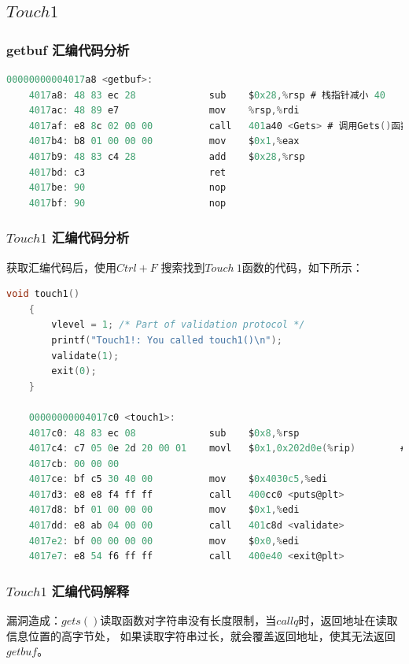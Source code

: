 \subsection{$Touch 1$}

\subsubsection{getbuf 汇编代码分析}
\begin{lstlisting}[language = C , title = { getbuf.c} ]
    00000000004017a8 <getbuf>:
    4017a8:	48 83 ec 28          	sub    $0x28,%rsp # 栈指针减小 40
    4017ac:	48 89 e7             	mov    %rsp,%rdi
    4017af:	e8 8c 02 00 00       	call   401a40 <Gets> # 调用Gets()函数
    4017b4:	b8 01 00 00 00       	mov    $0x1,%eax
    4017b9:	48 83 c4 28          	add    $0x28,%rsp
    4017bd:	c3                   	ret    
    4017be:	90                   	nop
    4017bf:	90                   	nop
\end{lstlisting}
\subsubsection{$Touch 1$ 汇编代码分析}

获取汇编代码后，使用$ Ctrl+F $ 搜索找到$ Touch\  1 $函数的代码，如下所示：
\begin{lstlisting}[language = C , title = { Touch 1.c } ]
    void touch1()
    {
        vlevel = 1; /* Part of validation protocol */
        printf("Touch1!: You called touch1()\n");
        validate(1);
        exit(0);
    }
    
    00000000004017c0 <touch1>:
    4017c0:	48 83 ec 08          	sub    $0x8,%rsp
    4017c4:	c7 05 0e 2d 20 00 01 	movl   $0x1,0x202d0e(%rip)        # 6044dc <vlevel>
    4017cb:	00 00 00 
    4017ce:	bf c5 30 40 00       	mov    $0x4030c5,%edi
    4017d3:	e8 e8 f4 ff ff       	call   400cc0 <puts@plt>
    4017d8:	bf 01 00 00 00       	mov    $0x1,%edi
    4017dd:	e8 ab 04 00 00       	call   401c8d <validate>
    4017e2:	bf 00 00 00 00       	mov    $0x0,%edi
    4017e7:	e8 54 f6 ff ff       	call   400e40 <exit@plt>
\end{lstlisting}

\subsubsection{$ Touch 1$ 汇编代码解释}
漏洞造成：$gets()$读取函数对字符串没有长度限制，当$callq$时，返回地址在读取信息位置的高字节处，
如果读取字符串过长，就会覆盖返回地址，使其无法返回$getbuf$。

